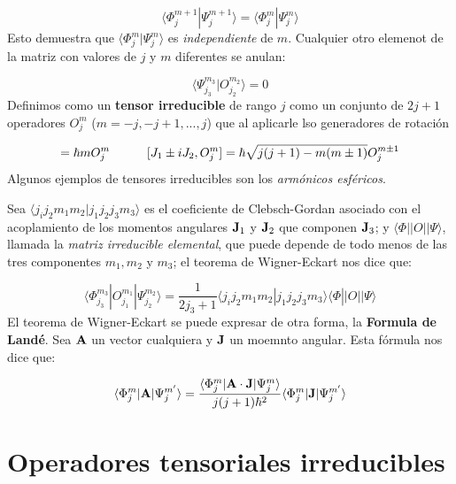 \begin{equation}
    \langle \Phi_j^{m+1} | \Psi_j^{m+1} \rangle = \langle \Phi_j^m |\Psi_j^m \rangle
\end{equation}
Esto demuestra que $\langle \Phi_j^m |\Psi_j^m \rangle$ es {\it independiente} de $m$. Cualquier otro elemenot de la matriz con valores de $j$ y $m$ diferentes se anulan:

\begin{equation}
    \langle \Psi_{j_3}^{m_3} | O_{j_2}^{m_2} \rangle = 0
\end{equation}
Definimos como un {\bf tensor irreducible} de rango $j$ como un conjunto de $2j+1$ operadores $O_{j}^m$  ($m=-j,-j+1,...,j$) que al aplicarle lso generadores de rotación

\begin{equation}
    [J_3,O_j^m] = \hbar m O_j^m \tquad [J_1\pm i J_2, O_j^m] = \hbar \sqrt{j(j+1)-m(m\pm 1)} O_{j}^{m\pm 1}
\end{equation}
Algunos ejemplos de tensores irreducibles son los {\it armónicos esféricos}. 

\begin{theorem}
    Sea $\langle j_i j_2 m_1 m_2 |j_1 j_2 j_3 m_3 \rangle$ es el coeficiente de Clebsch-Gordan asociado con el acoplamiento de los momentos angulares $\mathbf{J}_1$ y $\mathbf{J}_2$ que componen $\mathbf{J}_3$; y $\langle \Phi || O || \Psi\rangle$, llamada la {\it matriz irreducible elemental}, que puede depende de todo menos de las tres componentes $m_1,m_2$ y $m_3$; el teorema de Wigner-Eckart nos dice que:

    \begin{equation}
        \langle \Phi_{j_3}^{m_3} | O_{j_1}^{m_1} |\Psi_{j_2}^{m_2} \rangle = \frac{1}{2j_3+1} \langle  j_i j_2 m_1 m_2 | j_1 j_2 j_3 m_3 \rangle \langle \Phi || O || \Psi  \rangle
    \end{equation}
    El teorema de Wigner-Eckart se puede expresar de otra forma, la {\bf Formula de Landé}. Sea $\mathbf{A}$ un vector cualquiera y $\mathbf{J}$ un moemnto angular. Esta fórmula nos dice que:

    \begin{equation}
        \langle \Phi_{j}^{m} | \mathbf{A} |\Psi_{j}^{m'} \rangle = \frac{\langle \Phi_j^m |\mathbf{A} \cdot \mathbf{J} | \Psi_j^m\rangle }{j(j+1)\hbar^2} \langle \Phi_j^m | \mathbf{J}| \Psi_j^{m'}  \rangle
    \end{equation}
    
\end{theorem}

\section{Operadores tensoriales irreducibles}

 
